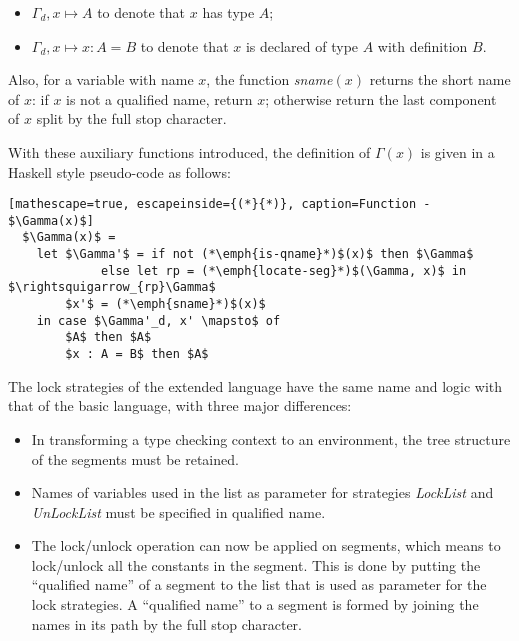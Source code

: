 \begin{itemize}
\item $\Gamma_d, x \mapsto A$ to denote that $x$ has type $A$;
\item $\Gamma_d, x \mapsto x : A = B$ to denote that $x$ is declared of type $A$ with definition $B$.
\end{itemize}
Also, for a variable with name $x$, the function \emph{sname}$(x)$ returns the short name of $x$: if $x$ is not a qualified name, return $x$; otherwise return the last component of $x$ split by the full stop character.

With these auxiliary functions introduced, the definition of $\Gamma(x)$ is given in a Haskell style pseudo-code as follows:
\begin{lstlisting}[mathescape=true, escapeinside={(*}{*)}, caption=Function - $\Gamma(x)$]
  $\Gamma(x)$ =
    let $\Gamma'$ = if not (*\emph{is-qname}*)$(x)$ then $\Gamma$
             else let rp = (*\emph{locate-seg}*)$(\Gamma, x)$ in $\rightsquigarrow_{rp}\Gamma$
        $x'$ = (*\emph{sname}*)$(x)$ 
    in case $\Gamma'_d, x' \mapsto$ of
        $A$ then $A$ 
        $x : A = B$ then $A$
\end{lstlisting}

The lock strategies of the extended language have the same name and logic with that of the basic language, with three major differences:
\begin{itemize}
\item In transforming a type checking context to an environment, the tree structure of the segments must be retained.
\item Names of variables used in the list as parameter for strategies \emph{LockList} and \emph{UnLockList} must be specified in qualified name.
\item The lock/unlock operation can now be applied on segments, which means to lock/unlock all the constants in the segment. This is done by putting the ``qualified name'' of a segment to the list that is used as parameter for the lock strategies. A ``qualified name'' to a segment is formed by joining the names in its path by the full stop character.
\end{itemize}
